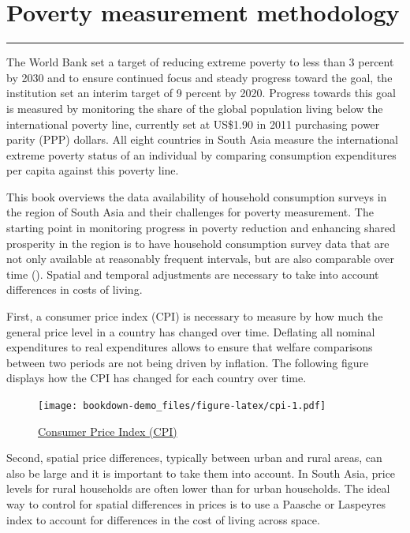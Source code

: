 \documentclass[13 pt,]{book}
\begin{document}
\chapter{Poverty measurement
methodology}\label{poverty-measurement-methodology}

\begin{center}\rule{0.5\linewidth}{\linethickness}\end{center}

The World Bank set a target of reducing extreme poverty to less than 3
percent by 2030 and to ensure continued focus and steady progress toward
the goal, the institution set an interim target of 9 percent by 2020.
Progress towards this goal is measured by monitoring the share of the
global population living below the international poverty line, currently
set at US\$1.90 in 2011 purchasing power parity (PPP) dollars. All eight
countries in South Asia measure the international extreme poverty status
of an individual by comparing consumption expenditures per capita
against this poverty line.

This book overviews the data availability of household consumption
surveys in the region of South Asia and their challenges for poverty
measurement. The starting point in monitoring progress in poverty
reduction and enhancing shared prosperity in the region is to have
household consumption survey data that are not only available at
reasonably frequent intervals, but are also comparable over time
(\citet{serajuddin2015data}). Spatial and temporal adjustments are
necessary to take into account differences in costs of living.

First, a consumer price index (CPI) is necessary to measure by how much
the general price level in a country has changed over time. Deflating
all nominal expenditures to real expenditures allows to ensure that
welfare comparisons between two periods are not being driven by
inflation. The following figure displays how the CPI has changed for
each country over time.

\begin{figure}[htbp]
\centering
\texttt{[image: bookdown-demo\_files/figure-latex/cpi-1.pdf]}
\caption{\label{fig:cpi}\href{https://tab.worldbank.org/\#/site/WBG/views/SAR_MNA_Summary/LineChart}{Consumer
Price Index (CPI)}}
\end{figure}

Second, spatial price differences, typically between urban and rural
areas, can also be large and it is important to take them into account.
In South Asia, price levels for rural households are often lower than
for urban households. The ideal way to control for spatial differences
in prices is to use a Paasche or Laspeyres index to account for
differences in the cost of living across space.
\end{document}
